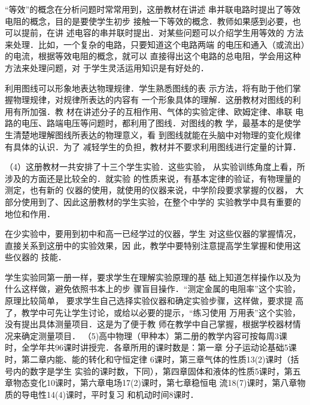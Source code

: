 “等效”的概念在分析问题时常常用到，这册教材在讲述
串并联电路时提出了等效电阻的概念，目的是要使学生初步
接触一下等效的概念．教师如果感到必要，也可以提前，在讲
述电容的串并联时提出．对某些问题可以介绍学生用等效的
方法来处理．比如，一个复杂的电路，只要知道这个电路两端
的电压和通入（或流出）的电流，根据等效电阻的概念，就可以
直接得出这个电路的总电阻，学会用这种方法来处理问题，对
于学生灵活运用知识是有好处的．

利用图线可以形象地表达物理规律．学生熟悉图线的表
示方法，将有助于他们掌握物理规律，对规律所表达的内容有
一个形象具体的理解．这册教材对图线的利用有所加强．教
材在讲述分子的互相作用、气体的实验定律、欧姆定律、串联
电路的电压、路端电压等问题时，都利用了图线．对图线的教
学，最基本的是使学生清楚地理解图线所表达的物理意义，看
到图线就能在头脑中对物理的变化规律有具体的认识．为了
减轻学生的负担，教材并不要求利用图线进行定量的计算．

（4）这册教材一共安排了十三个学生实验．这些实验，
从实验训练角度上看，所涉及的方面还是比较全的．就实验
的性质来说，有基本定律的验证，有物理量的测定，也有新的
仪器的使用，就使用的仪器来说，中学阶段要求掌握的仪器，
大部分使用到了、因此这册教材的学生实验，在整个中学的
实验教学中具有重要的地位和作用．

在少实验中，要用到初中和高一已经学过的仪器，学生
对这些仪器的掌握情况，直接关系到这册中的实验效果，因
此，教学中要特别注意提高学生掌握和使用这些仪器的
技能．

学生实验同第一册一样，要求学生在理解实验原理的基
础上知道怎样操作以及为什么这样做，避免依照书本上的步
骤盲目操作．“测定金属的电阻率”这个实验，原理比较简单，
要求学生自己选择实验仪器和确定实验步骤，这样做，要求提
高了，教学中可先让学生讨论，或给以必要的提示，“练习使用
万用表”这个实验，没有提出具体测量项目．这是为了便于教
师在教学中自己掌握，根据学校器材情况来确定测量项目．
（5)高中物理（甲种本）第二册的教学内容可按每周3课
时，全学年共96课时讲授完．各章所用的课时数是：第一章
分子运动论基础5课时，第二章内能、能的转化和守恒定律
6课时，第三章气体的性质13(2)课时（括号内的数字是学生
实验的课时数，下同），第四章固体和液体的性质5课时，第五
章物态变化10课时，第六章电场17(2)课时，第七章稳恒电
流18(7)课时，第八章物质的导电性14(4)课时，平时复习
和机动时间8课时．




































